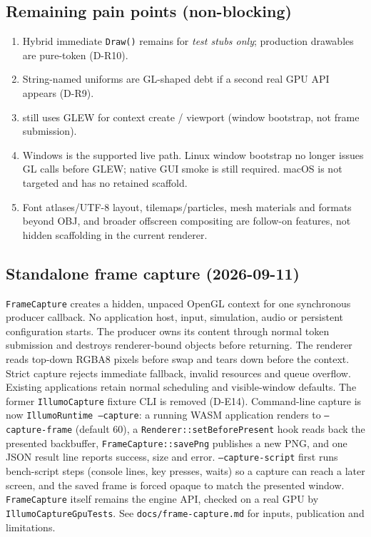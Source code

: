 \subsection{Remaining pain points (non-blocking)}
\begin{enumerate}
  \item Hybrid immediate \texttt{Draw()} remains for \emph{test stubs only};
        production drawables are pure-token (D-R10).
  \item String-named uniforms are GL-shaped debt if a second real GPU API appears
        (D-R9).
  \item {} still uses GLEW for context create / viewport
        (window bootstrap, not frame submission).
  \item Windows is the supported live path. Linux window bootstrap no longer
        issues GL calls before GLEW; native GUI smoke is still required.
        macOS is not targeted and has no retained scaffold.
  \item Font atlases/UTF-8 layout, tilemaps/particles, mesh materials and formats
        beyond OBJ, and broader offscreen compositing are follow-on features,
        not hidden scaffolding in the current renderer.
\end{enumerate}


\subsection{Standalone frame capture (2026-09-11)}
\texttt{FrameCapture} creates a hidden, unpaced OpenGL context for one synchronous
producer callback. No application host, input, simulation, audio or persistent
configuration starts. The producer owns its content through normal token
submission and destroys renderer-bound objects before returning. The renderer
reads top-down RGBA8 pixels before swap and tears down before the context.
Strict capture rejects immediate fallback, invalid resources and queue overflow.
Existing applications retain normal scheduling and visible-window defaults.
The former \texttt{IllumoCapture} fixture CLI is removed (D-E14). Command-line
capture is now \texttt{IllumoRuntime --capture}: a running WASM application
renders to \texttt{--capture-frame} (default 60), a
\texttt{Renderer::setBeforePresent} hook reads back the presented backbuffer,
\texttt{FrameCapture::savePng} publishes a new PNG, and one JSON result line
reports success, size and error. \texttt{--capture-script} first runs
bench-script steps (console lines, key presses, waits) so a capture can reach a
later screen, and the saved frame is forced opaque to match the presented
window. \texttt{FrameCapture} itself remains the
engine API, checked on a real GPU by \texttt{IllumoCaptureGpuTests}.
See \texttt{docs/frame-capture.md} for inputs, publication and limitations.

